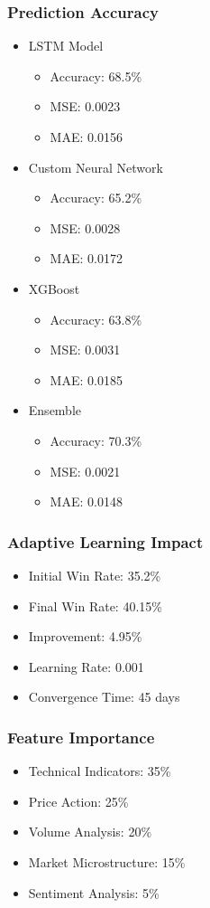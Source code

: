 \documentclass[conference]{IEEEtran}
\begin{document}
\subsubsection{Prediction Accuracy}
\begin{itemize}
    \item LSTM Model
    \begin{itemize}
        \item Accuracy: 68.5\%
        \item MSE: 0.0023
        \item MAE: 0.0156
    \end{itemize}
    \item Custom Neural Network
    \begin{itemize}
        \item Accuracy: 65.2\%
        \item MSE: 0.0028
        \item MAE: 0.0172
    \end{itemize}
    \item XGBoost
    \begin{itemize}
        \item Accuracy: 63.8\%
        \item MSE: 0.0031
        \item MAE: 0.0185
    \end{itemize}
    \item Ensemble
    \begin{itemize}
        \item Accuracy: 70.3\%
        \item MSE: 0.0021
        \item MAE: 0.0148
    \end{itemize}
\end{itemize}

\subsubsection{Adaptive Learning Impact}
\begin{itemize}
    \item Initial Win Rate: 35.2\%
    \item Final Win Rate: 40.15\%
    \item Improvement: 4.95\%
    \item Learning Rate: 0.001
    \item Convergence Time: 45 days
\end{itemize}

\subsubsection{Feature Importance}
\begin{itemize}
    \item Technical Indicators: 35\%
    \item Price Action: 25\%
    \item Volume Analysis: 20\%
    \item Market Microstructure: 15\%
    \item Sentiment Analysis: 5\%
\end{itemize}
\end{document}
